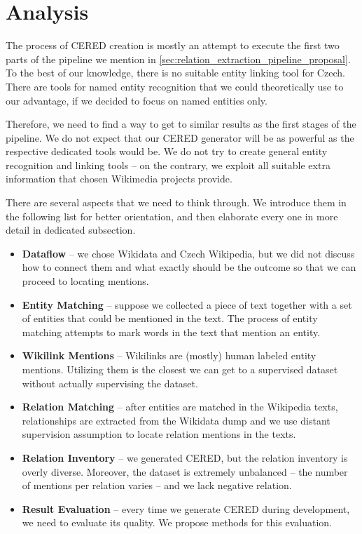 \section{Analysis}
\label{sec:analysis}
The process of CERED creation is mostly an attempt to execute the first two parts of the pipeline we mention in 
\autoref{sec:relation_extraction_pipeline_proposal}. To the best of our knowledge, there is no suitable entity linking tool for Czech. There are tools for named entity recognition that we could theoretically use to our advantage, if we decided to focus on named entities only.

Therefore, we need to find a way to get to similar results as the first stages of the pipeline. We do not expect that our CERED generator will be as powerful as the respective dedicated tools would be. We do not try to create general entity recognition and linking tools -- on the contrary, we exploit all suitable extra information that chosen Wikimedia projects provide.

There are several aspects that we need to think through. We introduce them in the following list for better orientation, and then elaborate every one in more detail in dedicated subsection. 
\begin{itemize}
 \item  \textbf{Dataflow} -- we chose Wikidata and Czech Wikipedia, but we did not discuss how to connect them and what exactly should be the outcome so that we can proceed to locating mentions.
 \item  \textbf{Entity Matching} -- suppose we collected a piece of text together with a set of entities that could be mentioned in the text. The process of entity matching attempts to mark words in the text that mention an entity.
 \item  \textbf{Wikilink Mentions} -- Wikilinks are (mostly) human labeled entity mentions. Utilizing them is the closest we can get to a supervised dataset without actually supervising the dataset.
 \item \textbf{Relation Matching} -- after entities are matched in the Wikipedia texts, relationships are extracted from the Wikidata dump and we use distant supervision assumption to locate relation mentions in the texts.
\item \textbf{Relation Inventory} -- we generated CERED, but the relation inventory is overly diverse. Moreover, the dataset is extremely unbalanced -- the number of mentions per relation varies -- and we lack negative relation.
 \item  \textbf{Result Evaluation} -- every time we generate CERED during development, we need to evaluate its quality. We propose methods for this evaluation. 
\end{itemize}




